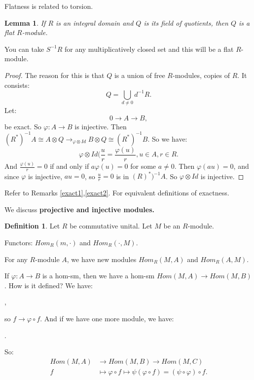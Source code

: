 \documentclass[9pt,reqno,twoside]{amsbook}
\theoremstyle{plain}
\numberwithin{section}{chapter}
\numberwithin{equation}{chapter}
\newtheorem{lem}[theorem]{Lemma}
\theoremstyle{definition}
\newtheorem{Def}[theorem]{Definition}
\theoremstyle{remark}
\theoremstyle{plain}
\newcommand{\bee}{\begin{equation}\begin{aligned}}
\newcommand{\eee}{\end{aligned}\end{equation}}
\newcommand{\fracc}{\frac}
\newcommand{\tens}{\otimes}
\renewcommand{\phi}{\varphi}
\begin{document}
Flatness is related to torsion. 

\begin{lem}\label{lem10.151}
If $R$ is an integral domain and $Q$ is its field of quotients, then $Q$ is a flat $R$-module. 
\end{lem}

You can take $S^{-1}R$ for any multiplicatively closed set and this will be a flat $R$-module.

\begin{proof}
The reason for this is that $Q$ is a union of free $R$-modules, copies of $R$. It consists:
$$
Q = \bigcup_{d \neq 0}d^{-1}R.
$$
Let:
$$
0 \to A \to B,
$$
be exact. So $\phi:A \to B$ is injective. Then $(R^*)^{-1}A \cong A \tens Q \to_{\phi \tens Id} B \tens Q \cong (R^*)^{-1}B$. So we have:
$$
\phi \tens Id(\fracc{u}{r} = \fracc{\phi(u)}{r}, u \in A,r \in R.
$$
And $\fracc{\phi(u)}{r}=0$ if and only if $a \phi(u) = 0$ for some $a \neq 0$. Then $\phi(au) = 0$, and since $\phi$ is injective, $au = 0$, so $\fracc{u}{r} = 0$ is in $(R)^*)^{-1}A$. So $\phi \tens Id$ is injective. 
\end{proof}


Refer to Remarks \ref{exact1},\ref{exact2}. For equivalent definitions of exactness. 

We discuss \textbf{projective and injective modules.} 

\begin{Def}
Let $R$ be commutative unital. Let $M$ be an $R$-module. 

Functors: $Hom_R(m,\cdot)$ and $Hom_R(\cdot,M)$. 

For any $R$-module $A$, we have new modules $Hom_R(M,A)$ and $Hom_R(A,M)$. 
\end{Def}

If $\phi:A \to B$ is a hom-sm, then we have a hom-sm $Hom(M,A) \to Hom(M,B)$. How is it defined? We have:
\begin{center}
,
\end{center}
so $f \to \phi \circ f$. And if we have one more module, we have:
\begin{center}
.
\end{center}
So:
\bee
Hom(M,A) &\to Hom(M,B) \to Hom(M,C)\\
f & \mapsto \phi \circ f \mapsto \psi(\phi \circ f) = (\psi \circ \phi) \circ f.
\eee
\end{document}
